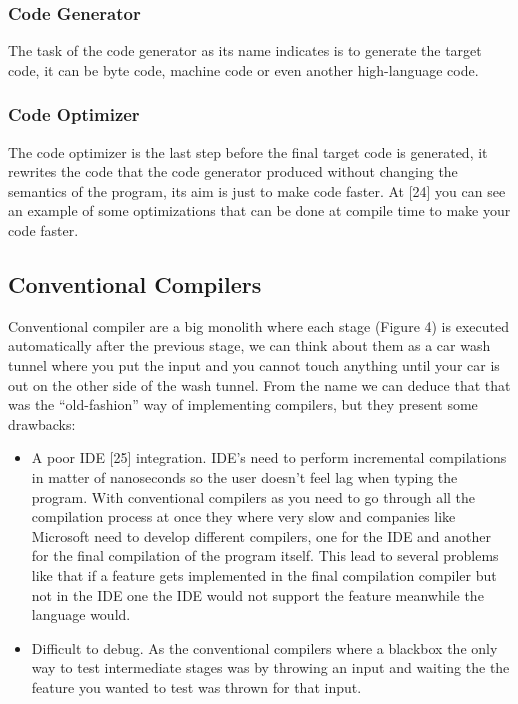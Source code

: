 \subsubsection{Code Generator}
The task of the code generator as its name indicates is to generate the target code, it can be byte code, machine code or even another high-language code.

\subsubsection{Code Optimizer}
The code optimizer is the last step before the final target code is generated, it rewrites the code that the code generator produced without changing the semantics of the program, its aim is just to make code faster. At [24] you can see an example of some optimizations that can be done at compile time to make your code faster.

\subsection{Conventional Compilers}
Conventional compiler are a big monolith where each stage (Figure 4) is executed automatically after the previous stage, we can think about them as a car wash tunnel where you put the input and you cannot touch anything until your car is out on the other side of the wash tunnel.
From the name we can deduce that that was the “old-fashion” way of implementing compilers, but they present some drawbacks:
\begin{itemize}
	\item A poor IDE [25] integration. IDE’s need to perform incremental compilations in matter of nanoseconds so the user doesn’t feel lag when typing the program. With conventional compilers as you need to go through all the compilation process at once they where very slow and companies like Microsoft need to develop different compilers, one for the IDE and another for the final compilation of the program itself. This lead to several problems like that if a feature gets implemented in the final compilation compiler but not in the IDE one the IDE would not support the feature meanwhile the language would.
	\item Difficult to debug. As the conventional compilers where a blackbox the only way to test intermediate stages was by throwing an input and waiting the the feature you wanted to test was thrown for that input.
\end{itemize}

